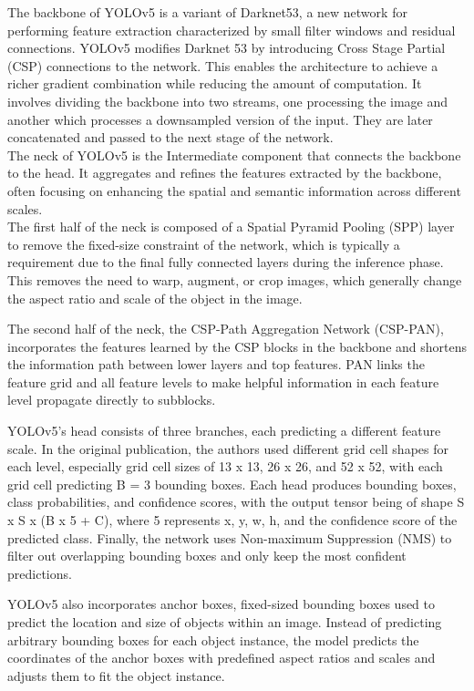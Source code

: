 \documentclass[10pt,twocolumn,letterpaper]{article}
\begin{document}
The backbone of YOLOv5 is a variant of Darknet53, a new network for performing feature extraction characterized by small filter windows and residual connections. YOLOv5 modifies Darknet 53 by introducing Cross Stage Partial (CSP) connections to the network. This enables the architecture to achieve a richer gradient combination while reducing the amount of computation. It involves dividing the backbone into two streams, one processing the image and another which processes a downsampled version of the input. They are later concatenated and passed to the next stage of the network. \\
The neck of YOLOv5 is the Intermediate component that connects the backbone to the head. It aggregates and refines the features extracted by the backbone, often focusing on enhancing the spatial and semantic information across different scales.\\
The first half of the neck is composed of a Spatial Pyramid Pooling (SPP) layer to remove the fixed-size constraint of the network, which is typically a requirement due to the final fully connected layers during the inference phase. This removes the need to warp, augment, or crop images, which generally change the aspect ratio and scale of the object in the image. 

The second half of the neck, the CSP-Path Aggregation Network (CSP-PAN), incorporates the features learned by the CSP blocks in the backbone and shortens the information path between lower layers and top features. PAN links the feature grid and all feature levels to make helpful information in each feature level propagate directly to subblocks.

YOLOv5’s head consists of three branches, each predicting a different feature scale. In the original publication, the authors used different grid cell shapes for each level, especially grid cell sizes of 13 x 13, 26 x 26, and 52 x 52, with each grid cell predicting B = 3 bounding boxes. Each head produces bounding boxes, class probabilities, and confidence scores, with the output tensor being of shape S x S x (B x 5 + C), where 5 represents x, y, w, h, and the confidence score of the predicted class. Finally, the network uses Non-maximum Suppression (NMS) to filter out overlapping bounding boxes and only keep the most confident predictions.

YOLOv5 also incorporates anchor boxes, fixed-sized bounding boxes used to predict the location and size of objects within an image. Instead of predicting arbitrary bounding boxes for each object instance, the model predicts the coordinates of the anchor boxes with predefined aspect ratios and scales and adjusts them to fit the object instance.
\end{document}
